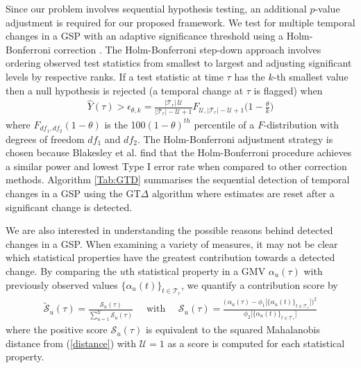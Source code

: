  

Since our problem involves sequential  hypothesis  testing, an additional $p$-value adjustment is required for our proposed framework. We test for multiple temporal changes in a GSP with  an adaptive significance threshold using a Holm-Bonferroni correction \cite{HB2010}. The Holm-Bonferroni step-down approach involves ordering observed test statistics  %
 from smallest to largest %
and adjusting significant levels by   respective ranks. %
 If a test statistic  at time $\tau$ has the $k$-th smallest value then  
a null hypothesis is rejected (a temporal change at $\tau$ is flagged)   when
\begin{align}
   \hat{Y}(\tau)     >  \epsilon_{\theta,k}=
 \frac{|\mathcal{T}_{r}|\,\mathcal{U} }{|\mathcal{T}_{r}| - \mathcal{U}+1} 
  F_{\mathcal{U} ,|\mathcal{T}_{r}| -\mathcal{U} +1}   \bigg( 1 -  \frac{\theta}{k}  \bigg )
 \label{CritVal}
\end{align}
where   $ F_{df_1,df_2}(1-\theta)$ 
is the 100$(1-\theta)^{th}$ percentile  of a $F$-distribution with degrees of freedom $df_1$ and $df_2$.  %
The Holm-Bonferroni adjustment strategy is chosen because Blakesley et al. \cite{MultiComp}
find that the Holm-Bonferroni procedure achieves a similar power and lowest Type I error rate when compared
to other correction methods. 
 Algorithm \ref{Tab:GTD} summarises the sequential detection of temporal changes in a GSP using  the GT$\Delta$ algorithm where estimates are reset after a significant change is detected.  

We are also interested in understanding the possible reasons behind detected changes in a GSP. When examining a variety  of measures, it may not be clear which statistical properties have the greatest contribution towards a detected change. By  comparing the  $u$th statistical property in a GMV $\alpha_u(\tau)$ with previously  observed values $\{\alpha_u(t)\}_{t \in \mathcal{T}_r } $, we quantify a contribution score by  
 \begin{align}
 \tilde{\mathcal{S}}_u (\tau) =\frac{  \mathcal{S}_u (\tau) }{  \displaystyle \sum_{u=1}^\mathcal{U} \mathcal{S}_u (\tau)} \quad \mbox{ with }\quad \mathcal{S}_u (\tau) %
= \frac{\Big(\,  \alpha_u(\tau) -  \phi_1 \Big[ \{ \alpha_u(t)  \}_{t \in \mathcal{T}_{r}}  \Big]  \Big)^2 } { \phi_2 \Big[ \{ \alpha_u(t)  \}_{t \in \mathcal{T}_{r}}  \Big]  }  \label{Score}
\end{align}
where the positive score $\mathcal{S}_u (\tau)$ is   equivalent to the squared Mahalanobis distance from (\ref{distance}) with $\mathcal{U}=1$ as  a score is computed for each statistical property. 

